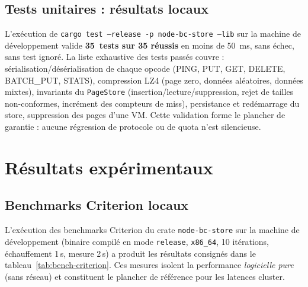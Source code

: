 \subsection{Tests unitaires : résultats locaux}

L'exécution de \texttt{cargo test --release -p node-bc-store --lib} sur la machine de développement valide \textbf{35~tests sur 35 réussis} en moins de 50~ms, sans échec, sans test ignoré. La liste exhaustive des tests passés couvre : sérialisation/désérialisation de chaque opcode (PING, PUT, GET, DELETE, BATCH\_PUT, STATS), compression LZ4 (page zero, données aléatoires, données mixtes), invariants du \texttt{PageStore} (insertion/lecture/suppression, rejet de tailles non-conformes, incrément des compteurs de miss), persistance et redémarrage du store, suppression des pages d'une VM. Cette validation forme le plancher de garantie : aucune régression de protocole ou de quota n'est silencieuse.

\section{Résultats expérimentaux}
\label{sec:resultats}

\subsection{Benchmarks Criterion locaux}

L'exécution des benchmarks Criterion du crate \texttt{node-bc-store} sur la machine de développement (binaire compilé en mode \texttt{release}, \texttt{x86\_64}, 10 itérations, échauffement 1\,s, mesure 2\,s) a produit les résultats consignés dans le tableau~\ref{tab:bench-criterion}. Ces mesures isolent la performance \emph{logicielle pure} (sans réseau) et constituent le plancher de référence pour les latences cluster.

